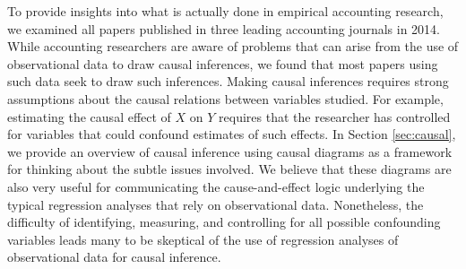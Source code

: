 \documentclass[12pt,reqno,titlepage]{amsart}
\begin{document}
\begin{doublespace}
To provide insights into what is actually done in empirical accounting research, we examined all papers published in three leading accounting journals in 2014. 
% 
While accounting researchers are aware of problems that can arise from the use of observational data to draw causal inferences, we found that most papers using such data seek to draw such inferences. 
Making causal inferences requires strong assumptions about the causal relations between variables studied.
For example, estimating the causal effect of $X$ on $Y$ requires that the researcher has controlled for variables that could confound estimates of such effects.
In Section \ref{sec:causal}, we provide an overview of causal inference using causal diagrams as a framework for thinking about the subtle issues involved.
We believe that these diagrams are also very useful for communicating the cause-and-effect logic underlying the typical regression analyses that rely on observational data.
Nonetheless, the difficulty of identifying, measuring, and controlling for all possible confounding variables leads many to be skeptical of the use of regression analyses of observational data for causal inference.


\end{doublespace}
\end{document}
